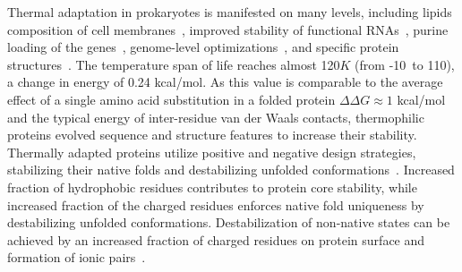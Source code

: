 \documentclass[10pt,letterpaper]{article}
\begin{document}
Thermal adaptation in prokaryotes is manifested on many levels, including lipids composition of cell membranes~\cite{Chugunov2014Liquid}, improved stability of functional RNAs~\cite{Galtier1997Relationships}, purine loading of the genes~\cite{Lambros2003Optimum},  genome-level optimizations~\cite{Sabath2013Growth,Saha2015Overlapping},  and specific protein structures~\cite{Szilagyi2000Structural,England2003Natural}. The temperature span of life reaches almost 120$K$ (from -10\textcelsius\ to 110\textcelsius), a change in energy of 0.24 kcal/mol. As this value is comparable to the average effect of a single amino acid substitution in a folded protein $\Delta\Delta G\approx 1$ kcal/mol~\cite{Zeldovich2007Proteinb} and the typical energy of inter-residue van der Waals contacts, thermophilic proteins evolved sequence and structure features to increase their stability. Thermally adapted proteins utilize positive and negative design strategies, stabilizing their native folds and destabilizing unfolded conformations~\cite{Berezovsky2007Positive}. Increased fraction of hydrophobic residues contributes to protein core stability, while increased fraction of the charged residues enforces native fold uniqueness by destabilizing unfolded conformations. Destabilization of non-native states can be achieved by an increased fraction of charged residues on protein surface and formation of ionic pairs~\cite{Szilagyi2000Structural,Zhao2011Charged}.
\end{document}
